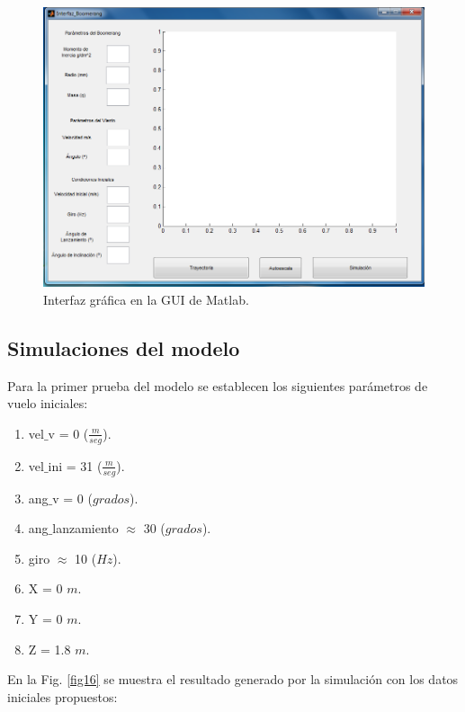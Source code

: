 		\begin{figure}[h]
		\begin{center}
		\includegraphics[scale=0.4]{imagenes/3-boomerang/GUIDE.png}
		\caption{Interfaz gráfica en la GUI de Matlab.}
		\label{fig15}
		\end{center}
		\end{figure}

\newpage
    \subsection{Simulaciones del modelo}

    Para la primer prueba del modelo se establecen los siguientes parámetros de vuelo iniciales:

		\begin{enumerate}
		\item{vel$\_$v = 0 {($\frac{m}{seg}$)}.}
		\item{vel$\_$ini = 31 {($\frac{m}{seg}$)}.}
		\item{ang$\_$v = 0 {($grados$)}.}
  		\item{ang$\_$lanzamiento $\approx$ 30 {($grados$)}.}
		\item{giro $\approx$ 10 {($Hz$)}.}
     	\item{X = 0 $m$.}
     	\item{Y = 0 $m$.}
     	\item{Z = 1.8 $m$.}
		\end{enumerate}

	En la Fig. \ref{fig16} se muestra el resultado generado por la simulación con los datos iniciales propuestos:

